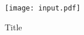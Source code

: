 \documentclass{article}
\begin{document}
\begin{figure}[htbp]
    \centering
        \texttt{[image: input.pdf]}     %
    \caption{Title}
    \label{fig:somthing}
\end{figure}

\end{document}
